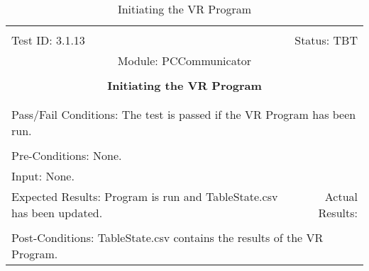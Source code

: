 \documentclass[titlepage]{article}
\begin{document}
\begin{center}%
\begin{table}
\begin{tabular}{|l r|}\hline&\\[-2mm]
	Test ID: 3.1.13	&Status: TBT\\[-3mm]
	\multicolumn{2}{|c|}{Module: PCCommunicator}\\&\\
	\multicolumn{2}{|c|}{\textbf{\large{Initiating the VR Program}}}\\&\\\hline&\\[-3mm]
	\multicolumn{2}{|p{\textwidth}|}{Pass/Fail Conditions: The test is passed if the VR Program has been run.}\\[1mm]\hline&\\[-3mm]
	\multicolumn{2}{|p{\textwidth}|}{Pre-Conditions: None.}\\[4mm]
	\multicolumn{2}{|p{\textwidth}|}{Input: None.}\\[2mm]\hline
	\multicolumn{1}{|p{0.49\textwidth}}{Expected Results: Program is run and TableState.csv has been updated.}	&\multicolumn{1}{|p{0.45\textwidth}|}{Actual Results: }\\\hline&\\[-3mm]
	\multicolumn{2}{|p{\textwidth}|}{Post-Conditions: TableState.csv contains the results of the VR Program.}\\\hline
\end{tabular}
\caption{Initiating the VR Program}
\end{table}
\end{center}
\end{document}
